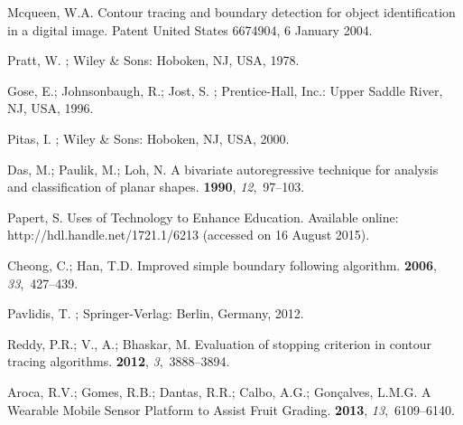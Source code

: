 \documentclass[sensors,article,accept,moreauthors,pdftex,10pt,a4paper]{mdpi}
\begin{document}
\begin{thebibliography}{999} 

Mcqueen, W.A.
\newblock Contour tracing and boundary detection for object identification in a
 digital image.
\newblock Patent United States 6674904, 6 January 2004.

Pratt, W.
; Wiley \& Sons: Hoboken, NJ, USA, 1978.

Gose, E.; Johnsonbaugh, R.; Jost, S.
; Prentice-Hall, Inc.:
 Upper Saddle River, NJ, USA, 1996.

Pitas, I.
; Wiley \& Sons: Hoboken, NJ, USA, 2000.

Das, M.; Paulik, M.; Loh, N.
\newblock A bivariate autoregressive technique for analysis and classification
 of planar shapes.
 {\bf 1990}, {\em 12},~97--103.

Papert, S.
\newblock Uses of Technology to Enhance Education. Available online: http://hdl.handle.net/1721.1/6213 (accessed on 16 August 2015).

Cheong, C.; Han, T.D.
\newblock Improved simple boundary following algorithm.
 {\bf 2006}, {\em 33},~427--439.

Pavlidis, T.
; Springer-Verlag: Berlin, Germany, 2012.

Reddy, P.R.; V., A.; Bhaskar, M.
\newblock Evaluation of stopping criterion in contour tracing algorithms.
 {\bf 2012}, {\em 3},~3888--3894.

Aroca, R.V.; Gomes, R.B.; Dantas, R.R.; Calbo, A.G.; Gonçalves, L.M.G.
\newblock A Wearable Mobile Sensor Platform to Assist Fruit Grading.
 {\bf 2013}, {\em 13},~6109--6140.


\end{thebibliography}
\end{document}
